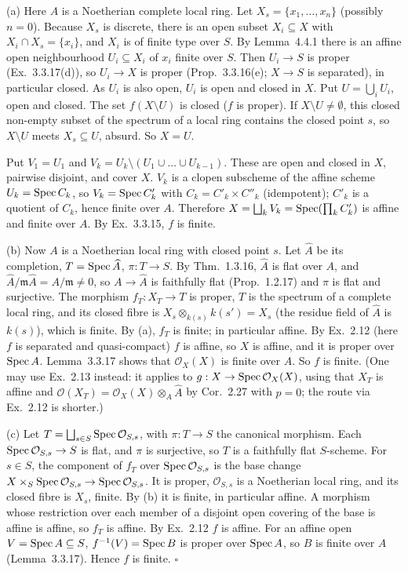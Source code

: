 \documentclass[11pt]{article}
\begin{document}
(a) Here $A$ is a Noetherian complete local ring. Let $X_s=\{x_1,\dots,x_n\}$ (possibly $n=0$). Because $X_s$ is discrete, there is an open subset $X_i\subseteq X$ with $X_i\cap X_s=\{x_i\}$, and $X_i$ is of finite type over $S$. By Lemma~4.4.1 there is an affine open neighbourhood $U_i\subseteq X_i$ of $x_i$ finite over $S$. Then $U_i\to S$ is proper (Ex.~3.3.17(d)), so $U_i\to X$ is proper (Prop.~3.3.16(e); $X\to S$ is separated), in particular closed. As $U_i$ is also open, $U_i$ is open and closed in $X$. Put $U=\bigcup_iU_i$, open and closed. The set $f(X\setminus U)$ is closed ($f$ is proper). If $X\setminus U\ne\emptyset$, this closed non-empty subset of the spectrum of a local ring contains the closed point $s$, so $X\setminus U$ meets $X_s\subseteq U$, absurd. So $X=U$.

Put $V_1=U_1$ and $V_k=U_k\setminus(U_1\cup\dots\cup U_{k-1})$. These are open and closed in $X$, pairwise disjoint, and cover $X$. $V_k$ is a clopen subscheme of the affine scheme $U_k=\operatorname{Spec} C_k$, so $V_k=\operatorname{Spec} C'_k$ with $C_k=C'_k\times C''_k$ (idempotent); $C'_k$ is a quotient of $C_k$, hence finite over $A$. Therefore $X=\bigsqcup_kV_k=\operatorname{Spec}(\prod_kC'_k)$ is affine and finite over $A$. By Ex.~3.3.15, $f$ is finite.

(b) Now $A$ is a Noetherian local ring with closed point $s$. Let $\widehat A$ be its completion, $T=\operatorname{Spec}\widehat A$, $\pi:T\to S$. By Thm.~1.3.16, $\widehat A$ is flat over $A$, and $\widehat A/\mathfrak m\widehat A=A/\mathfrak m\ne0$, so $A\to\widehat A$ is faithfully flat (Prop.~1.2.17) and $\pi$ is flat and surjective. The morphism $f_T:X_T\to T$ is proper, $T$ is the spectrum of a complete local ring, and its closed fibre is $X_s\otimes_{k(s)}k(s')=X_s$ (the residue field of $\widehat A$ is $k(s)$), which is finite. By (a), $f_T$ is finite; in particular affine. By Ex.~2.12 (here $f$ is separated and quasi-compact) $f$ is affine, so $X$ is affine, and it is proper over $\operatorname{Spec} A$. Lemma~3.3.17 shows that $\mathcal O_X(X)$ is finite over $A$. So $f$ is finite. (One may use Ex.~2.13 instead: it applies to $g:X\to\operatorname{Spec}\mathcal O_X(X)$, using that $X_T$ is affine and $\mathcal O(X_T)=\mathcal O_X(X)\otimes_A\widehat A$ by Cor.~2.27 with $p=0$; the route via Ex.~2.12 is shorter.)

(c) Let $T=\bigsqcup_{s\in S}\operatorname{Spec}\mathcal O_{S,s}$, with $\pi:T\to S$ the canonical morphism. Each $\operatorname{Spec}\mathcal O_{S,s}\to S$ is flat, and $\pi$ is surjective, so $T$ is a faithfully flat $S$-scheme. For $s\in S$, the component of $f_T$ over $\operatorname{Spec}\mathcal O_{S,s}$ is the base change $X\times_S\operatorname{Spec}\mathcal O_{S,s}\to\operatorname{Spec}\mathcal O_{S,s}$. It is proper, $\mathcal O_{S,s}$ is a Noetherian local ring, and its closed fibre is $X_s$, finite. By (b) it is finite, in particular affine. A morphism whose restriction over each member of a disjoint open covering of the base is affine is affine, so $f_T$ is affine. By Ex.~2.12 $f$ is affine. For an affine open $V=\operatorname{Spec} A\subseteq S$, $f^{-1}(V)=\operatorname{Spec} B$ is proper over $\operatorname{Spec} A$, so $B$ is finite over $A$ (Lemma~3.3.17). Hence $f$ is finite. \hfill$\square$
\end{document}
